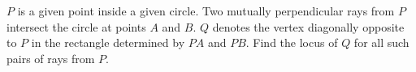$P$ is a given point inside a given circle. Two mutually perpendicular rays from $P$ intersect the circle at points $A$ and $B$. $Q$ denotes the vertex diagonally opposite to $P$ in the rectangle determined by $PA$ and $PB$. Find the locus of $Q$ for all such pairs of rays from $P$.
